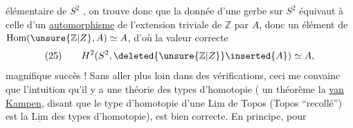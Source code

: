 élémentaire de $S^2$ , on trouve donc
que la donnée d'une gerbe sur $S^2$ équivaut
à celle d'un \uline{automorphisme} de
l'extension triviale  de $\mathbb Z$ par $A$,
donc  un élément de $\operatorname{Hom}(\unsure{\mathbb Z|Z},A)\simeq A$,
d'où la valeur correcte
\[
(25)\qquad H^2(S^2,\deleted{\unsure{\mathbb Z|Z}}\inserted{A})\simeq A,
\]
magnifique succès ! Sans aller plus
loin dans des vérifications, ceci me
convainc que l'intuition qu'il y
a une théorie des 
 types d'homotopie ( un
théorème  la \uline{van Kampen}, disant
que le type d'homotopie d'une
$\underline{\mathrm{Lim}}$ de Topos (Topos ``recollé'') est
la $\underline{\mathrm{Lim}}$ des types d'homotopie),
est bien correcte. En principe, pour

